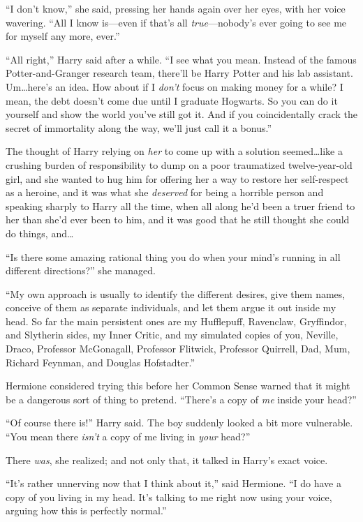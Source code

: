 “I don’t know,” she said, pressing her hands again over her eyes, with her voice wavering. “All I know is—even if that’s all \emph{true}—nobody’s ever going to see me for myself any more, ever.”

“All right,” Harry said after a while. “I see what you mean. Instead of the famous Potter-and-Granger research team, there’ll be Harry Potter and his lab assistant. Um…here’s an idea. How about if I \emph{don’t} focus on making money for a while? I mean, the debt doesn’t come due until I graduate Hogwarts. So you can do it yourself and show the world you’ve still got it. And if you coincidentally crack the secret of immortality along the way, we’ll just call it a bonus.”

The thought of Harry relying on \emph{her} to come up with a solution seemed…like a crushing burden of responsibility to dump on a poor traumatized twelve-year-old girl, and she wanted to hug him for offering her a way to restore her self-respect as a heroine, and it was what she \emph{deserved} for being a horrible person and speaking sharply to Harry all the time, when all along he’d been a truer friend to her than she’d ever been to him, and it was good that he still thought she could do things, and…

“Is there some amazing rational thing you do when your mind’s running in all different directions?” she managed.

“My own approach is usually to identify the different desires, give them names, conceive of them as separate individuals, and let them argue it out inside my head. So far the main persistent ones are my Hufflepuff, Ravenclaw, Gryffindor, and Slytherin sides, my Inner Critic, and my simulated copies of you, Neville, Draco, Professor McGonagall, Professor Flitwick, Professor Quirrell, Dad, Mum, Richard Feynman, and Douglas Hofstadter.”

Hermione considered trying this before her Common Sense warned that it might be a dangerous sort of thing to pretend. “There’s a copy of \emph{me} inside your head?”

“Of course there is!” Harry said. The boy suddenly looked a bit more vulnerable. “You mean there \emph{isn’t} a copy of me living in \emph{your} head?”

There \emph{was}, she realized; and not only that, it talked in Harry’s exact voice.

“It’s rather unnerving now that I think about it,” said Hermione. “I do have a copy of you living in my head. It’s talking to me right now using your voice, arguing how this is perfectly normal.”

